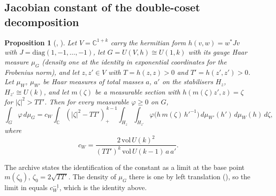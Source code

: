 \documentclass[11pt]{article}
\newtheorem{proposition}[theorem]{Proposition}
\theoremstyle{remark}
\begin{document}
\subsection{Jacobian constant of the double-coset decomposition}

\begin{proposition}[, ]\label{prop:sl6b}
Let $V=\mathbb C^{1+k}$ carry the hermitian form $h(v,w)=w^*Jv$ with $J=\mathrm{diag}(1,-1,\dots,-1)$, let $G=U(V,h)\cong U(1,k)$ with its gauge Haar measure $\mu_G$ (density one at the identity in exponential coordinates for the Frobenius norm), and let $z,z'\in V$ with $T=h(z,z)>0$ and $T'=h(z',z')>0$. Let $\mu_W$, $\mu_{W'}$ be Haar measures of total masses $a$, $a'$ on the stabilisers $H_z$, $H_{z'}\cong U(k)$, and let $m(\zeta)$ be a measurable section with $h(m(\zeta)z',z)=\zeta$ for $\lvert\zeta\rvert^2>TT'$. Then for every measurable $\varphi\ge0$ on $G$,
\[
\int_G\varphi\,d\mu_G=c_{W}\int_{\mathbb C}(\lvert\zeta\rvert^2-TT')_+^{\,k-1}\int_{H_z}\int_{H_{z'}}\varphi\bigl(h\,m(\zeta)\,h'^{-1}\bigr)\,d\mu_{W'}(h')\,d\mu_W(h)\,d\zeta,
\]
where
\[
c_W=\frac{2\,\mathrm{vol}\,U(k)^2}{(TT')^k\,\mathrm{vol}\,U(k-1)\,a\,a'}.
\]
\end{proposition}

The archive states the identification of the constant as a limit at the base point $m(\zeta_0)$, $\zeta_0=2\sqrt{TT'}$. The density of $\mu_G$ there is one by left translation (), so the limit in  equals $c_W^{-1}$, which is the identity above.
\end{document}
